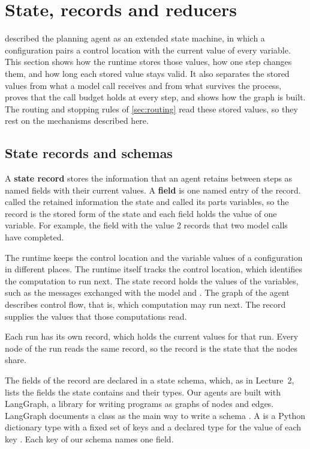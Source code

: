 \section{State, records and reducers}
\label{sec:records}

 described the planning agent as an extended state machine, in which a
configuration pairs a control location with the current value of every variable. This section shows
how the runtime stores those values, how one step changes them, and how long each stored value stays
valid. It also separates the stored values from what a model call receives and from what survives
the process, proves that the call budget holds at every step, and shows how the graph is built. The
routing and stopping rules of \cref{sec:routing} read these stored values, so they rest on the
mechanisms described here.

\subsection{State records and schemas}
\label{sec:records-schema}

A \textbf{state record} stores the information that an agent retains between steps as named fields
with their current values. A \textbf{field} is one named entry of the record. 
called the retained information the state and called its parts variables, so the record is the
stored form of the state and each field holds the value of one variable. For example, the field
 with the value 2 records that two model calls have completed.

The runtime keeps the control location and the variable values of a configuration in different
places. The runtime itself
tracks the control location, which identifies the computation to run next. The state record holds
the values of the variables, such as the messages exchanged with the model and
. The graph of the agent describes control flow, that is, which computation
may run next. The record supplies the values that those computations read.

Each run has its own record, which holds the current values for that run. Every node of the run
reads the same record, so the record is the state that the nodes share.

The fields of the record are declared in a state schema, which, as in Lecture~2, lists the fields
the state contains and their types. Our agents are built with LangGraph, a library for writing
programs as graphs of nodes and edges. LangGraph documents a  class as the main
way to write a schema \citep{langgraph-graph-api}. A  is a Python dictionary type
with a fixed set of keys and a declared type for the value of each key \citep{pep589}. Each key of
our schema names one field.

